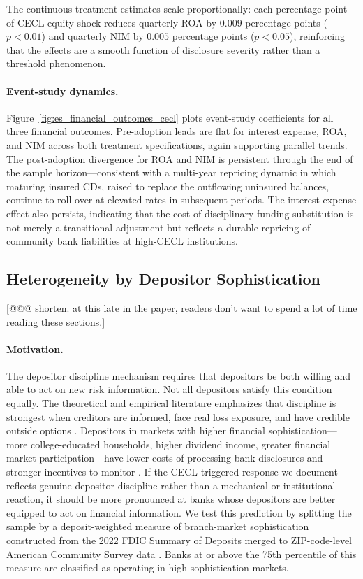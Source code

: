 The continuous treatment estimates scale proportionally: each percentage point of
CECL equity shock reduces quarterly ROA by $0.009$ percentage points ($p < 0.01$)
and quarterly NIM by $0.005$ percentage points ($p < 0.05$), reinforcing that the
effects are a smooth function of disclosure severity rather than a threshold
phenomenon.

\paragraph{Event-study dynamics.}
Figure~\ref{fig:es_financial_outcomes_cecl} plots event-study coefficients for
all three financial outcomes.  Pre-adoption leads are flat for interest expense,
ROA, and NIM across both treatment specifications, again supporting parallel
trends.  The post-adoption divergence for ROA and NIM is persistent through the
end of the sample horizon---consistent with a multi-year repricing dynamic in
which maturing insured CDs, raised to replace the outflowing uninsured balances,
continue to roll over at elevated rates in subsequent periods.  The interest
expense effect also persists, indicating that the cost of disciplinary funding
substitution is not merely a transitional adjustment but reflects a durable
repricing of community bank liabilities at high-CECL institutions.

\subsection{Heterogeneity by Depositor Sophistication} [@@@ shorten. at this late in the paper, readers don't want to spend a lot of time reading these sections.]
\label{sec:results:sophistication}

\paragraph{Motivation.}
The depositor discipline mechanism requires that depositors be both willing and
able to act on new risk information.  Not all depositors satisfy this condition
equally.  The theoretical and empirical literature emphasizes that discipline is
strongest when creditors are informed, face real loss exposure, and have credible
outside options \citep{flannery1998using, nier2006market}.  Depositors in
markets with higher financial sophistication---more college-educated households,
higher dividend income, greater financial market participation---have lower costs
of processing bank disclosures and stronger incentives to monitor
\citep{danisewicz2021debtholder}.  If the CECL-triggered response we document
reflects genuine depositor discipline rather than a mechanical or institutional
reaction, it should be more pronounced at banks whose depositors are better
equipped to act on financial information.  We test this prediction by splitting
the sample by a deposit-weighted measure of branch-market sophistication
constructed from the 2022 FDIC Summary of Deposits merged to ZIP-code-level
American Community Survey data \citep{ACS2022}.  Banks at or above the 75th
percentile of this measure are classified as operating in high-sophistication
markets.

